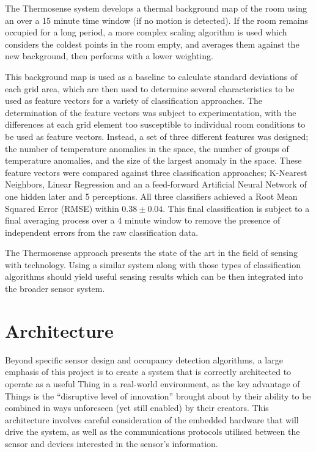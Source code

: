 \documentclass[../thesis/thesis.tex]{subfiles}
\begin{document}
The Thermosense system develops a thermal background map of the room using an \emwa over a 15 minute time window (if no motion is detected). If the room remains occupied for a long period, a more complex scaling algorithm is used which considers the coldest points in the room empty, and averages them against the new background, then performs \emwa with a lower weighting.

This background map is used as a baseline to calculate standard deviations of each grid area, which are then used to determine several characteristics to be used as feature vectors for a variety of classification approaches. The determination of the feature vectors was subject to experimentation, with the differences at each grid element too susceptible to individual room conditions to be used as feature vectors. Instead, a set of three different features was designed; the number of temperature anomalies in the space, the number of groups of temperature anomalies, and the size of the largest anomaly in the space. These feature vectors were compared against three classification approaches; K-Nearest Neighbors, Linear Regression and an a feed-forward Artificial Neural Network of one hidden later and 5 perceptions. All three classifiers achieved a Root Mean Squared Error (RMSE) within $0.38\pm0.04$. This final classification is subject to a final averaging process over a 4 minute window to remove the presence of independent errors from the raw classification data.

The Thermosense approach presents the state of the art in the field of sensing with \iar technology. Using a similar \iar system along with those types of classification algorithms should yield useful sensing results which can be then integrated into the broader sensor system.

\section{Architecture}
\label{sec:litreview:architecture}
Beyond specific sensor design and occupancy detection algorithms, a large emphasis of this project is to create a system that is correctly architected to operate as a useful Thing in a real-world \iot environment, as the key advantage of Things is the ``disruptive level of innovation''\cite{atzori2010internet} brought about by their ability to be combined in ways unforeseen (yet still enabled) by their creators. This architecture involves careful consideration of the embedded hardware that will drive the system, as well as the communications protocols utilised between the sensor and devices interested in the sensor's information.
\end{document}
